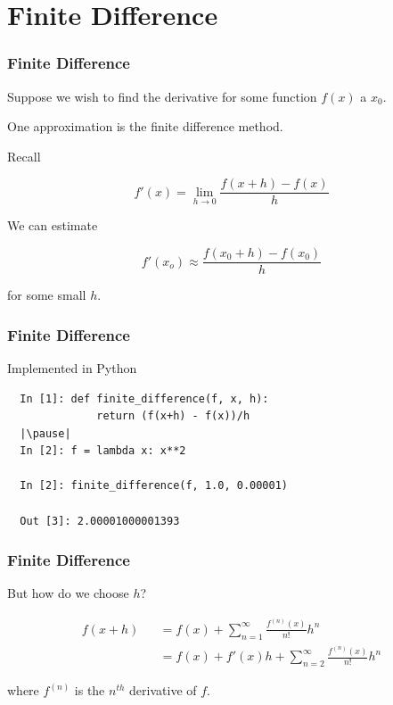 \documentclass{beamer}
\begin{document}
\section{Finite Difference}

\begin{frame}
\frametitle{Finite Difference}

Suppose we wish to find the derivative for some function $f(x)$ a $x_0$.

\pause
One approximation is the finite difference method.

\pause
Recall

\[ f'(x) = \lim_{h \to 0} \frac{f(x+h)-f(x)}{h} \]

\pause
We can estimate

\[ f'(x_o) \approx \frac{f(x_0+h)-f(x_0)}{h} \]

for some small $h$.

\end{frame}

\begin{frame}[fragile]
\frametitle{Finite Difference}

Implemented in Python

\begin{lstlisting}
  In [1]: def finite_difference(f, x, h):
              return (f(x+h) - f(x))/h
  |\pause|
  In [2]: f = lambda x: x**2

  In [2]: finite_difference(f, 1.0, 0.00001)

  Out [3]: 2.00001000001393
\end{lstlisting}

\end{frame}

\begin{frame}[fragile]
\frametitle{Finite Difference}

But how do we choose $h$? \pause

\begin{eqnarray*} f(x + h) && = f(x) + \sum_{n = 1}^{\infty} \frac{f^{(n)}(x)}{n!}h^n \\ && = f(x) + f'(x)h + \sum_{n = 2}^{\infty} \frac{f^{(n)}(x)}{n!}h^n \end{eqnarray*}

where $f^{(n)}$ is the $n^{th}$ derivative of $f$.

\end{frame}
\end{document}

